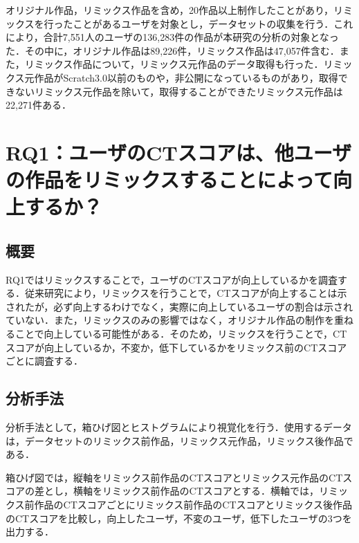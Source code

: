 \documentclass[11pt]{jreport}
\begin{document}
オリジナル作品，リミックス作品を含め，20作品以上制作したことがあり，リミックスを行ったことがあるユーザを対象とし，データセットの収集を行う．これにより，合計7,551人のユーザの136,283件の作品が本研究の分析の対象となった．その中に，オリジナル作品は89,226件，リミックス作品は47,057件含む．また，リミックス作品について，リミックス元作品のデータ取得も行った．リミックス元作品がScratch3.0以前のものや，非公開になっているものがあり，取得できないリミックス元作品を除いて，取得することができたリミックス元作品は22,271件ある．
\chapter{RQ1：ユーザのCTスコアは、他ユーザの作品をリミックスすることによって向上するか？}

\section{概要}
RQ1ではリミックスすることで，ユーザのCTスコアが向上しているかを調査する．従来研究により，リミックスを行うことで，CTスコアが向上することは示されたが，必ず向上するわけでなく，実際に向上しているユーザの割合は示されていない．また，リミックスのみの影響ではなく，オリジナル作品の制作を重ねることで向上している可能性がある．そのため，リミックスを行うことで，CTスコアが向上しているか，不変か，低下しているかをリミックス前のCTスコアごとに調査する．

\section{分析手法}
分析手法として，箱ひげ図とヒストグラムにより視覚化を行う．使用するデータは，データセットのリミックス前作品，リミックス元作品，リミックス後作品である．

箱ひげ図では，縦軸をリミックス前作品のCTスコアとリミックス元作品のCTスコアの差とし，横軸をリミックス前作品のCTスコアとする．横軸では，リミックス前作品のCTスコアごとにリミックス前作品のCTスコアとリミックス後作品のCTスコアを比較し，向上したユーザ，不変のユーザ，低下したユーザの3つを出力する．
\end{document}
